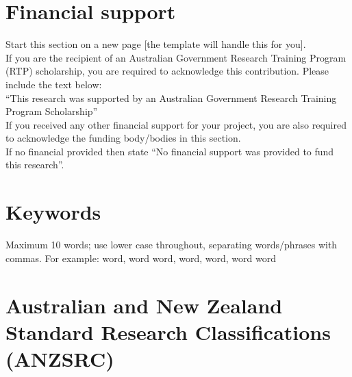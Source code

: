 



\clearpage
\section*{Financial support}

\begin{instructional}
    Start this section on a new page [the template will handle this for you].\\
    
    \noindent
    If you are the recipient of an Australian Government Research Training Program (RTP) scholarship, you are required to acknowledge this contribution.  Please include the text below:\\
    
    \noindent
    ``This research was supported by an Australian Government Research Training Program Scholarship''\\
    
    \noindent
    If you received any other financial support for your project, you are also required to acknowledge the funding body/bodies in this section.\\
    
    \noindent
    If no financial provided then state ``No financial support was provided to fund this research''.
\end{instructional}





\section*{Keywords}

\begin{instructional}
	Maximum 10 words; use lower case throughout, separating words/phrases with commas. For example: word, word word, word, word, word word
\end{instructional}




\section*{Australian and New Zealand Standard Research Classifications (ANZSRC)}


